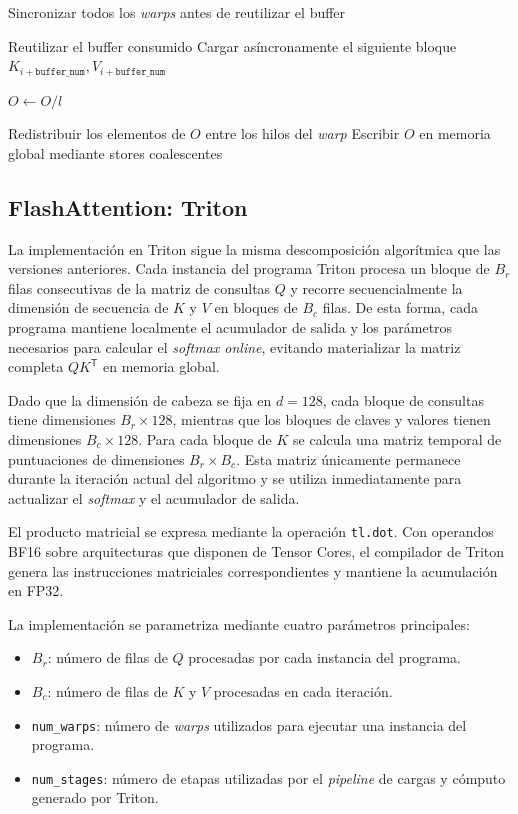 \begin{algorithm}[H]
\begin{algorithmic}[1]
\State Sincronizar todos los \textit{warps} antes de reutilizar el buffer

    \State Reutilizar el buffer consumido
    \State Cargar asíncronamente el siguiente bloque \(K_{i+\texttt{buffer\_num}},V_{i+\texttt{buffer\_num}}\)
\EndIf

\EndFor

\State \(O \gets O/l\)

\State Redistribuir los elementos de \(O\) entre los hilos del \textit{warp}
\State Escribir \(O\) en memoria global mediante stores coalescentes

\end{algorithmic}
\end{algorithm}

\subsection{FlashAttention: Triton}

La implementación en Triton sigue la misma descomposición algorítmica que las versiones anteriores. Cada instancia del programa Triton procesa un bloque de \(B_r\) filas consecutivas de la matriz de consultas \(Q\) y recorre secuencialmente la dimensión de secuencia de \(K\) y \(V\) en bloques de \(B_c\) filas. De esta forma, cada programa mantiene localmente el acumulador de salida y los parámetros necesarios para calcular el \textit{softmax online}, evitando materializar la matriz completa \(QK^\mathsf{T}\) en memoria global.

Dado que la dimensión de cabeza se fija en \(d=128\), cada bloque de consultas tiene dimensiones \(B_r\times128\), mientras que los bloques de claves y valores tienen dimensiones \(B_c\times128\). Para cada bloque de \(K\) se calcula una matriz temporal de puntuaciones de dimensiones \(B_r\times B_c\). Esta matriz únicamente permanece durante la iteración actual del algoritmo y se utiliza inmediatamente para actualizar el \textit{softmax} y el acumulador de salida.

El producto matricial se expresa mediante la operación \texttt{tl.dot}. Con operandos BF16 sobre arquitecturas que disponen de Tensor Cores, el compilador de Triton genera las instrucciones matriciales correspondientes y mantiene la acumulación en FP32.

La implementación se parametriza mediante cuatro parámetros principales:

\begin{itemize}
\item \(B_r\): número de filas de \(Q\) procesadas por cada instancia del programa.
\item \(B_c\): número de filas de \(K\) y \(V\) procesadas en cada iteración.
\item \texttt{num\_warps}: número de \textit{warps} utilizados para ejecutar una instancia del programa.
\item \texttt{num\_stages}: número de etapas utilizadas por el \textit{pipeline} de cargas y cómputo generado por Triton.
\end{itemize}

